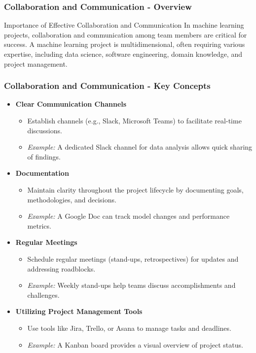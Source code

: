 \documentclass[aspectratio=169]{beamer}
\begin{document}
\begin{frame}[fragile]
    \frametitle{Collaboration and Communication - Overview}
    \begin{block}{Importance of Effective Collaboration and Communication}
        In machine learning projects, collaboration and communication among team members are critical for success. A machine learning project is multidimensional, often requiring various expertise, including data science, software engineering, domain knowledge, and project management.
    \end{block}
\end{frame}

\begin{frame}[fragile]
    \frametitle{Collaboration and Communication - Key Concepts}
    \begin{itemize}
        \item \textbf{Clear Communication Channels}
            \begin{itemize}
                \item Establish channels (e.g., Slack, Microsoft Teams) to facilitate real-time discussions.
                \item \textit{Example:} A dedicated Slack channel for data analysis allows quick sharing of findings.
            \end{itemize}
        
        \item \textbf{Documentation}
            \begin{itemize}
                \item Maintain clarity throughout the project lifecycle by documenting goals, methodologies, and decisions.
                \item \textit{Example:} A Google Doc can track model changes and performance metrics.
            \end{itemize}
        
        \item \textbf{Regular Meetings}
            \begin{itemize}
                \item Schedule regular meetings (stand-ups, retrospectives) for updates and addressing roadblocks.
                \item \textit{Example:} Weekly stand-ups help teams discuss accomplishments and challenges.
            \end{itemize}
        
        \item \textbf{Utilizing Project Management Tools}
            \begin{itemize}
                \item Use tools like Jira, Trello, or Asana to manage tasks and deadlines.
                \item \textit{Example:} A Kanban board provides a visual overview of project status.
            \end{itemize}
    \end{itemize}
\end{frame}
\end{document}
